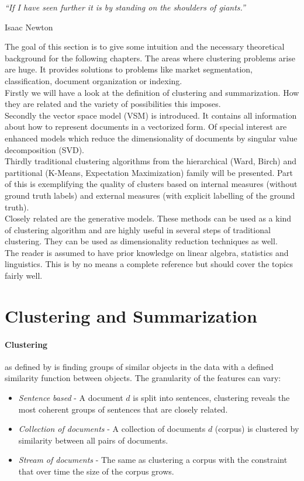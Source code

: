\epigraph{\emph{
  ``If I have seen further it is by standing on the shoulders of giants.''
}}{ Isaac Newton }

The goal of this section is to give some intuition and the necessary theoretical background for the following chapters. The areas where clustering problems arise are huge. It provides solutions to problems like market segmentation, classification, document organization or indexing.\\
Firstly we will have a look at the definition of clustering and summarization. How they are related and the variety of possibilities this imposes.\\
Secondly the vector space model (VSM) is introduced. It contains all information about how to represent documents in a vectorized form. Of special interest are enhanced models which reduce the dimensionality of documents by singular value decomposition (SVD).\\
Thirdly traditional clustering algorithms from the hierarchical (Ward, Birch) and partitional (K-Means, Expectation Maximization) family will be presented. Part of this is exemplifying the quality of clusters based on internal measures (without ground truth labels) and external measures (with explicit labelling of the ground truth).\\
Closely related are the generative models. These methods can be used as a kind of clustering algorithm and are highly useful in several steps of traditional clustering. They can be used as dimensionality reduction techniques as well.\\
The reader is assumed to have prior knowledge on linear algebra, statistics and linguistics. This is by no means a complete reference but should cover the topics fairly well.\\


\section{Clustering and Summarization}
  
  \paragraph{Clustering} as defined by \cite{ClusterAlgoSurveyIBM} is finding groups of similar objects in the data with a defined similarity function between objects. The granularity of the features can vary:

  \begin{itemize}
    \item \emph{Sentence based} - A document $d$ is split into sentences, clustering reveals the most coherent groups of sentences that are closely related.
    \item \emph{Collection of documents} - A collection of documents $d$ (corpus) is clustered by similarity between all pairs of documents.
    \item \emph{Stream of documents} - The same as clustering a corpus with the constraint that over time the size of the corpus grows.
  \end{itemize}

